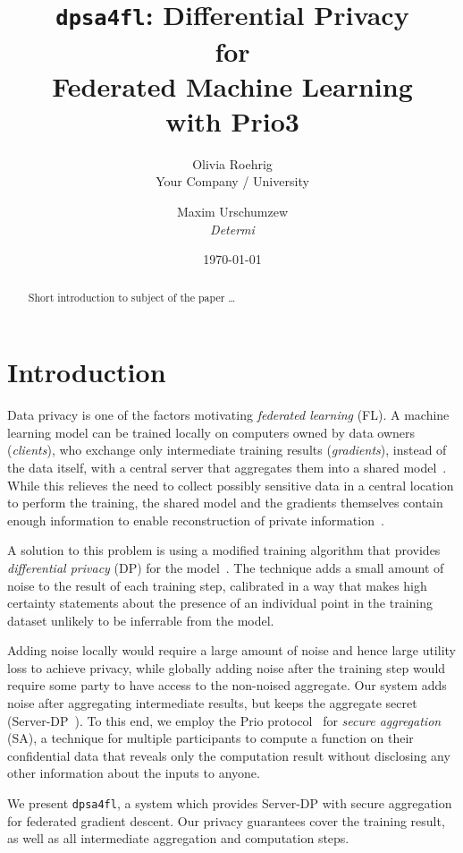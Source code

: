 \documentclass{article}
\title{\texttt{dpsa4fl}: Differential Privacy \\ for \\ Federated Machine
  Learning \\ with Prio3}
\author{Olivia Roehrig  \\
	Your Company / University  \\
	\and
	Maxim Urschumzew \\
	\textit{Determi} \\
	}
\date{\today}
\begin{document}
\maketitle


\begin{abstract}
Short introduction to subject of the paper \ldots 
\end{abstract}

\section{Introduction}
Data privacy is one of the factors motivating \emph{federated learning} (FL). A
machine learning model can be trained locally on computers owned by data owners
(\emph{clients}), who exchange only intermediate training results
(\emph{gradients}), instead of the data itself, with a central server that
aggregates them into a shared model~\cite{McMahan2016CommunicationEfficientLO}.
While this relieves the need to collect possibly sensitive data in a central
location to perform the training, the shared model and the gradients themselves
contain enough information to enable reconstruction of private
information~\cite{7958568,Boenisch2021WhenTC}.

A solution to this problem is using a modified training algorithm that provides
\emph{differential privacy} (DP) for the model~\cite{Abadi_2016}. The technique adds
a small amount of noise to the result of each training step, calibrated in a way
that makes high certainty statements about the presence of an individual point
in the training dataset unlikely to be inferrable from the model.

Adding noise locally would require a large amount of noise and hence large
utility loss to achieve privacy, while globally adding noise after the training
step would require some party to have access to the non-noised aggregate. Our
system adds noise after aggregating intermediate results, but keeps the
aggregate secret (Server-DP~\cite{dprio}). To this end,
we employ the Prio protocol~\cite{prio} for \emph{secure aggregation} (SA), a technique for multiple
participants to compute a function on their confidential data that reveals only
the computation result without disclosing any other information about the
inputs to anyone.

We present \texttt{dpsa4fl}, a system which provides Server-DP with
secure aggregation for federated gradient descent. Our privacy guarantees cover the training result,
as well as all intermediate aggregation and computation steps.
\end{document}

